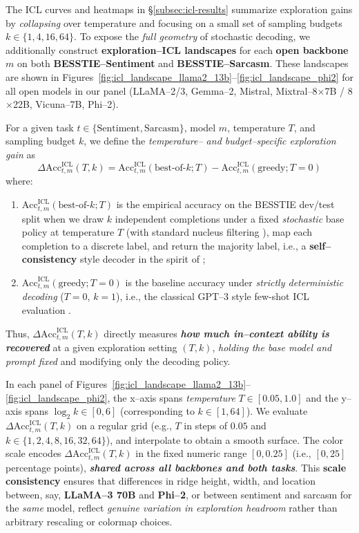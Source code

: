 The ICL curves and heatmaps in \S\ref{subsec:icl-results} summarize
exploration gains by \emph{collapsing} over temperature and focusing on a
small set of sampling budgets $k \in \{1,4,16,64\}$. To expose the \emph{full
geometry} of stochastic decoding, we additionally construct
\textbf{exploration--ICL landscapes} for each \textbf{open backbone} $m$ on both
\textbf{BESSTIE--Sentiment} and \textbf{BESSTIE--Sarcasm}. These
landscapes are shown in
Figures~\ref{fig:icl_landscape_llama2_13b}--\ref{fig:icl_landscape_phi2}
for all open models in our panel (LLaMA--2/3, Gemma--2, Mistral,
Mixtral--8$\times$7B / 8$\times$22B, Vicuna--7B, Phi--2).

For a given task $t \in \{\text{Sentiment},\text{Sarcasm}\}$, model $m$,
temperature $T$, and sampling budget $k$, we define the
\emph{temperature-- and budget--specific exploration gain} as
\[\boxed{
  \Delta \mathrm{Acc}^{\mathrm{ICL}}_{t,m}(T,k)
  =
  \mathrm{Acc}^{\mathrm{ICL}}_{t,m}(\text{best-of-}k; T)
  -
  \mathrm{Acc}^{\mathrm{ICL}}_{t,m}(\text{greedy}; T{=}0)
  }
\]
where:
\begin{enumerate}[leftmargin=1.5em]
  \item $\mathrm{Acc}^{\mathrm{ICL}}_{t,m}(\text{best-of-}k; T)$ is the
        empirical accuracy on the BESSTIE dev/test split when we draw
        $k$ independent completions under a fixed \emph{stochastic} base
        policy at temperature $T$ (with standard nucleus filtering
        \citep{holtzman2019curious}), map each completion to a discrete
        label, and return the majority label, i.e., a
        \textbf{self--consistency} style decoder in the spirit of
        \citet{wei2022chainofthought,wang2022selfconsistency,yao2023treeofthought};
  \item $\mathrm{Acc}^{\mathrm{ICL}}_{t,m}(\text{greedy}; T{=}0)$ is the
        baseline accuracy under \emph{strictly deterministic decoding}
        ($T{=}0$, $k{=}1$), i.e., the classical GPT--3 style few-shot
        ICL evaluation \citep{brown2020language}.
\end{enumerate}
Thus, $\Delta \mathrm{Acc}^{\mathrm{ICL}}_{t,m}(T,k)$ directly measures
\emph{\textbf{how much in--context ability is recovered}} at a given
exploration setting $(T,k)$, \emph{holding the base model and prompt fixed}
and modifying only the decoding policy.

In each panel of
Figures~\ref{fig:icl_landscape_llama2_13b}--\ref{fig:icl_landscape_phi2},
the x--axis spans \emph{temperature} $T \in [0.05,1.0]$ and the y--axis
spans $\log_2 k \in [0,6]$ (corresponding to $k \in [1,64]$). We evaluate
$\Delta \mathrm{Acc}^{\mathrm{ICL}}_{t,m}(T,k)$ on a regular grid
(e.g., $T$ in steps of $0.05$ and $k \in \{1,2,4,8,16,32,64\}$), and
interpolate to obtain a smooth surface. The color scale encodes
$\Delta \mathrm{Acc}^{\mathrm{ICL}}_{t,m}(T,k)$ in the fixed numeric
range $[0,0.25]$ (i.e., $[0,25]$ percentage points),
\emph{\textbf{shared across all backbones and both tasks}}. This
\textbf{scale consistency} ensures that differences in ridge height,
width, and location between, say, \textbf{LLaMA--3 70B} and \textbf{Phi--2},
or between sentiment and sarcasm for the \emph{same} model, reflect
\emph{genuine variation in exploration headroom} rather than arbitrary
rescaling or colormap choices.

